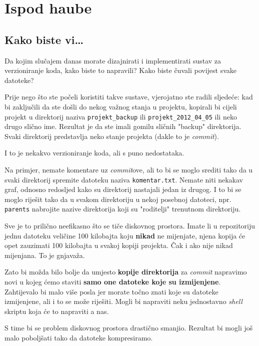 \chapter*{Ispod haube}

\section*{Kako biste vi\dots}

Da kojim slučajem danas morate dizajnirati i implementirati sustav za verzioniranje koda, kako biste to napravili?
Kako biste čuvali povijest svake datoteke?

Prije nego što ste počeli koristiti takve sustave, vjerojatno ste radili sljedeće: kad bi zaključili da ste došli do nekog važnog stanja u projektu, kopirali bi cijeli projekt u direktorij naziva \verb+projekt_backup+ ili \verb+projekt_2012_04_05+ ili neko drugo slično ime.
Rezultat je da ste imali gomilu sličnih "backup" direktorija.
Svaki direktorij predstavlja neko stanje projekta (dakle to je \emph{commit}).

I to je nekakvo verzioniranje koda, ali s puno nedostataka.

Na primjer, nemate komentare uz \emph{commit}ove, ali to bi se moglo srediti tako da u svaki direktorij spremite datoteku naziva \verb+komentar.txt+.
Nemate niti nekakav graf, odnosno redosljed kako su direktorij nastajali jedan iz drugog.
I to bi se moglo riješit tako da u svakom direktoriju u nekoj posebnoj datoteci, npr. \verb+parents+ nabrojite nazive direktorija koji su "roditelji" trenutnom direktoriju.

Sve je to prilično neefikasno što se tiče diskovnog prostora. 
Imate li u repozitoriju jednu datoteku veličine 100 kilobajta koju \textbf{nikad} ne mijenjate, njena kopija će opet zauzimati 100 kilobajta u svakoj kopiji projekta.
Čak i ako nije nikad mijenjana.
To je gnjavaža.

Zato bi možda bilo bolje da umjesto \textbf{kopije direktorija} za \emph{commit} napravimo novi u kojeg ćemo staviti \textbf{samo one datoteke koje su izmijenjene}.
Zahtijevalo bi malo više posla jer morate točno znati koje su datoteke izmijenjene, ali i to se može riješiti.
Mogli bi napraviti neku jednostavno \emph{shell} skriptu koja će to napraviti a nas. 

S time bi se problem diskovnog prostora drastično smanjio. 
Rezultat bi mogli još malo poboljšati tako da datoteke kompresiramo.

